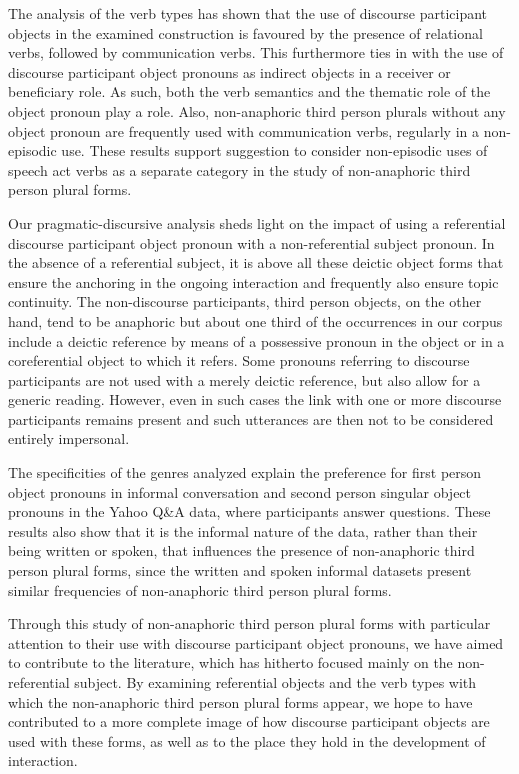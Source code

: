 \documentclass[output=paper]{langscibook}
\begin{document}
The analysis of the verb types has shown that the use of discourse participant objects in the examined construction is favoured by the presence of relational verbs, followed by communication verbs. This furthermore ties in with the use of discourse participant object pronouns as indirect objects in a receiver or beneficiary role. As such, both the verb semantics and the thematic role of the object pronoun play a role. Also, non-anaphoric third person plurals without any object pronoun are frequently used with communication verbs, regularly in a non-episodic use. These results support  suggestion to consider non-episodic uses of speech act verbs as a separate category in the study of non-anaphoric third person plural forms. 

Our pragmatic-discursive analysis sheds light on the impact of using a referential discourse participant object pronoun with a non-referential subject pronoun. In the absence of a referential subject, it is above all these deictic object forms that ensure the anchoring in the ongoing interaction and frequently also ensure topic continuity. The non-discourse participants, third person objects, on the other hand, tend to be anaphoric but about one third of the occurrences in our corpus include a deictic reference by means of a possessive pronoun in the object or in a coreferential object to which it refers. Some pronouns referring to discourse participants are not used with a merely deictic reference, but also allow for a generic reading. However, even in such cases the link with one or more discourse participants remains present and such utterances are then not to be considered entirely impersonal. 

The specificities of the genres analyzed explain the preference for first person object pronouns in informal conversation and second person singular object pronouns in the Yahoo Q\&A data, where participants answer questions. These results also show that it is the informal nature of the data, rather than their being written or spoken, that influences the presence of non-anaphoric third person plural forms, since the written and spoken informal datasets present similar frequencies of non-anaphoric third person plural forms.

Through this study of non-anaphoric third person plural forms with particular attention to their use with discourse participant object pronouns, we have aimed to contribute to the literature, which has hitherto focused mainly on the non-referential subject. By examining referential objects and the verb types with which the non-anaphoric third person plural forms appear, we hope to have contributed to a more complete image of how discourse participant objects are used with these forms, as well as to the place they hold in the development of interaction. 
\end{document}
